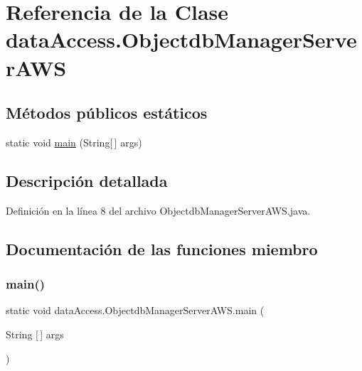\hypertarget{classdataAccess_1_1ObjectdbManagerServerAWS}{}\section{Referencia de la Clase data\+Access.\+Objectdb\+Manager\+Server\+A\+WS}
\label{classdataAccess_1_1ObjectdbManagerServerAWS}
\subsection*{Métodos públicos estáticos}
\begin{DoxyCompactItemize}
\item 
static void \mbox{\hyperlink{classdataAccess_1_1ObjectdbManagerServerAWS_a97455f62cfd633493d3d49eb5566f41e}{main}} (String\mbox{[}$\,$\mbox{]} args)
\end{DoxyCompactItemize}


\subsection{Descripción detallada}


Definición en la línea 8 del archivo Objectdb\+Manager\+Server\+A\+W\+S.\+java.



\subsection{Documentación de las funciones miembro}
\mbox{\label{classdataAccess_1_1ObjectdbManagerServerAWS_a97455f62cfd633493d3d49eb5566f41e}} 
\subsubsection{\texorpdfstring{main()}{main()}}
{\footnotesize\ttfamily static void data\+Access.\+Objectdb\+Manager\+Server\+A\+W\+S.\+main (\begin{DoxyParamCaption}\item[{String \mbox{[}$\,$\mbox{]}}]{args }\end{DoxyParamCaption})\hspace{0.3cm}{\ttfamily [static]}}



